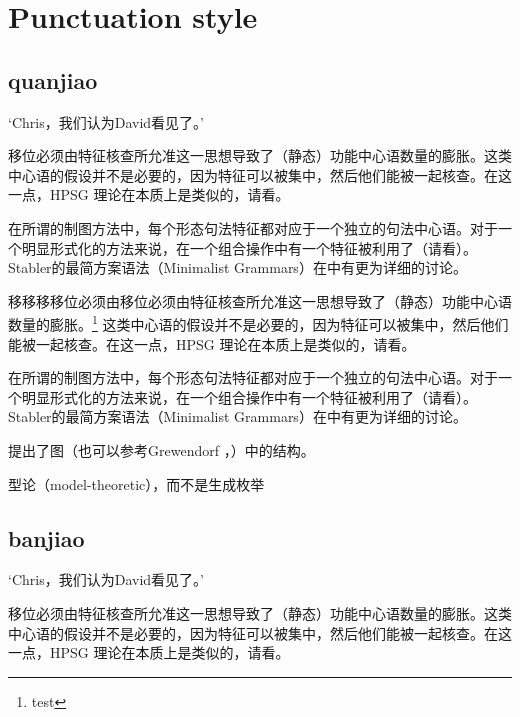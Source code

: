 \documentclass{scrbook}
\let\citew\citealp
\newcommand{\page}{}
\begin{document}
\chapter{Punctuation style}

\section{quanjiao}


    `Chris，我们认为David看见了。'

移位必须由特征核查所允准这一思想导致了（静态）功能中心语数量的膨胀。这类中心语的假设并不是必要的，因为特征可以被集中，然后他们能被一起核查。在这一点，HPSG 理论在本质上是类似的，请看\citew[\S~II.3.3.4, \S~II.4.2]{Sternefeld2006a-u}。

在所谓的制图方法中，每个形态句法特征都对应于一个独立的句法中心语\citep[\page 54, 61]{CR2010a}。对于一个明显形式化的方法来说，在一个组合操作中有一个特征被利用了（请看\citew[\page 335]{Stabler2001a}）。Stabler的最简方案语法（Minimalist Grammars）在中有更为详细的讨论。

移移移移位必须由移位必须由特征核查所允准这一思想导致了（静态）功能中心语数量的膨胀。\footnote{test} 这类中心语的假设并不是必要的，因为特征可以被集中，然后他们能被一起核查。在这一点，HPSG 理论在本质上是类似的，请看\citew[\S~II.3.3.4, \S~II.4.2]{Sternefeld2006a-u}。

在所谓的制图方法中，每个形态句法特征都对应于一个独立的句法中心语\citep[\page 54, 61]{CR2010a}。对于一个明显形式化的方法来说，在一个组合操作中有一个特征被利用了（请看\citew[\page 335]{Stabler2001a}）。Stabler的最简方案语法（Minimalist Grammars）在中有更为详细的讨论。

\citet[\page 297]{Rizzi97a-u}提出了图（也可以参考Grewendorf \citeyear[\page 85, 240]{Grewendorf2002a}，\citeyear{Grewendorf2009a}）中的结构。

型论（model-theoretic），而不是生成枚举


\section{banjiao}



    `Chris，我们认为David看见了。'

移位必须由特征核查所允准这一思想导致了（静态）功能中心语数量的膨胀。这类中心语的假设并不是必要的，因为特征可以被集中，然后他们能被一起核查。在这一点，HPSG 理论在本质上是类似的，请看\citew[\S~II.3.3.4, \S~II.4.2]{Sternefeld2006a-u}。
\end{document}
